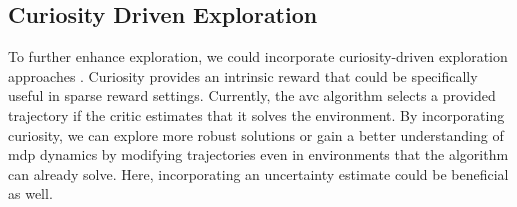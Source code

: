\subsection{Curiosity Driven Exploration}
To further enhance exploration, we could incorporate curiosity-driven exploration approaches \cite{pathak2017curiositydriven}. 
Curiosity provides an intrinsic reward that could be specifically useful in sparse reward settings. 
Currently, the \ac{avc} algorithm selects a provided trajectory if the critic estimates that it solves the environment. By incorporating curiosity, 
we can explore more robust solutions or gain a better understanding of \ac{mdp} dynamics by modifying trajectories even in environments that the 
algorithm can already solve. Here, incorporating an uncertainty estimate could be beneficial as well.